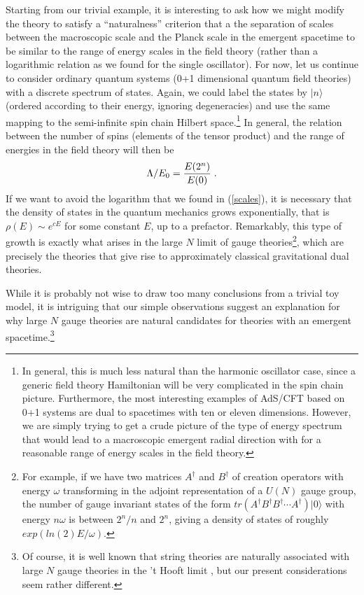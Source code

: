 \documentclass[12pt,epsf]{article}
\renewcommand{\(}{\left(}
\renewcommand{\)}{\right)}
\begin{document}
Starting from our trivial example, it is interesting to ask how we might modify the theory to satisfy a ``naturalness'' criterion that a the separation of scales between the macroscopic scale and the Planck scale in the emergent spacetime to be similar to the range of energy scales in the field theory (rather than a logarithmic relation as we found for the single oscillator). For now, let us continue to consider ordinary quantum systems (0+1 dimensional quantum field theories) with a discrete spectrum of states. Again, we could label the states by $|n \rangle$ (ordered according to their energy, ignoring degeneracies) and use the same mapping to the semi-infinite spin chain Hilbert space.\footnote{ In general, this is much less natural than the harmonic oscillator case, since a generic field theory Hamiltonian will be very complicated in the spin chain picture. Furthermore, the most interesting examples of AdS/CFT based on 0+1 systems are dual to spacetimes with ten or eleven dimensions.  However, we are simply trying to get a crude picture of the type of energy spectrum that would lead to a macroscopic emergent radial direction with for a reasonable range of energy scales in the field theory.} In general, the relation between the number of spins (elements of the tensor product) and the range of energies in the field theory will then be
\[
\Lambda/E_0 = {E(2^{n}) \over E(0)} \; .
\]
If we want to avoid the logarithm that we found in (\ref{scales}), it is necessary that the density of states in the quantum mechanics grows exponentially, that is $\rho(E) \sim e^{c E}$ for some constant $E$, up to a prefactor. Remarkably, this type of growth is exactly what arises in the large $N$ limit of gauge theories\footnote{For example, if we have two matrices $A^\dagger$ and $B^\dagger$ of creation operators with energy $\omega$ transforming in the adjoint representation of a $U(N)$ gauge group, the number of gauge invariant states of the form $tr(A^\dagger B^\dagger B^\dagger \cdots A^\dagger)|0 \rangle$ with energy $n \omega$ is between $2^n/n$ and $2^n$, giving a density of states of roughly $exp(ln(2) E/\omega)$.}, which are precisely the theories that give rise to approximately classical gravitational dual theories.

While it is probably not wise to draw too many conclusions from a trivial toy model, it is intriguing that our simple observations suggest an explanation for why large $N$ gauge theories are natural candidates for theories with an emergent spacetime.\footnote{Of course, it is well known that string theories are naturally associated with large $N$ gauge theories in the 't Hooft limit \cite{thooft}, but our present considerations seem rather different.}
\end{document}
